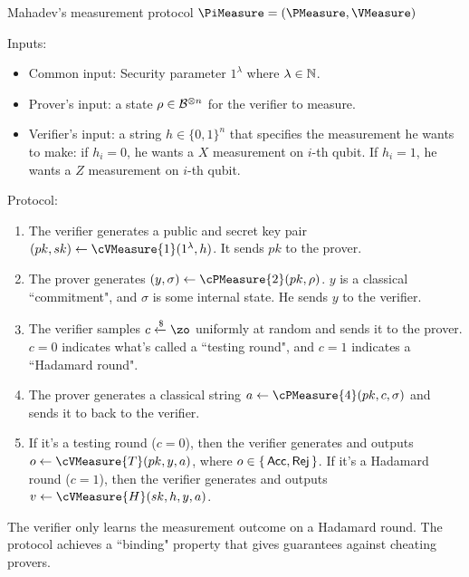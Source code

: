 \begin{protocol}{Mahadev's measurement protocol $\PiMeasure=(\PMeasure, \VMeasure)$}
\label{proto:urmila4}

Inputs:
\begin{itemize}
	\item Common input: Security parameter $1^\lambda$ where $\lambda\in\mathbb{N}$.
	\item Prover's input: a state $\rho\in\mathcal{B}^{\otimes n}$ for the verifier to measure.
	\item Verifier's input:
			a string $h \in \{0,1\}^n$ that specifies the measurement he wants to make: if $h_i=0$, he wants a $X$ measurement on $i$-th qubit. If $h_i=1$, he wants a $Z$ measurement on $i$-th qubit.  
\end{itemize}

Protocol:
\begin{enumerate}
	\item \label{step:measure1} The verifier generates a public and secret key pair $(pk, sk)\leftarrow\cVMeasure{1}(1^\lambda, h)$. It sends $pk$ to the prover.
	\item \label{step:measure2} The prover generates $(y, \sigma)\leftarrow\cPMeasure{2}(pk, \rho)$.
		$y$ is a classical ``commitment", and $\sigma$ is some internal state.
		He sends $y$ to the verifier.
	\item \label{step:measure3} The verifier samples $c\xleftarrow{\$}\zo$ uniformly at random and sends it to the prover. $c=0$ indicates what's called a ``testing round", and $c=1$ indicates a ``Hadamard round".
	\item \label{step:measure4} The prover generates a classical string $a\leftarrow\cPMeasure{4}(pk, c, \sigma)$ and sends it to back to the verifier.
	\item \label{step:output} If it's a testing round ($c=0$), then the verifier generates and outputs $o\leftarrow\cVMeasure{T}(pk, y, a)$, where $o\in\set{\mathsf{Acc}, \mathsf{Rej}}$. 
		If it's  a Hadamard round ($c=1$), then the verifier generates and outputs $v\leftarrow\cVMeasure{H}(sk, h, y, a)$.
\end{enumerate}
\end{protocol}

The verifier only learns the measurement outcome on a Hadamard round.
The protocol achieves a ``binding" property that gives guarantees against cheating provers.


